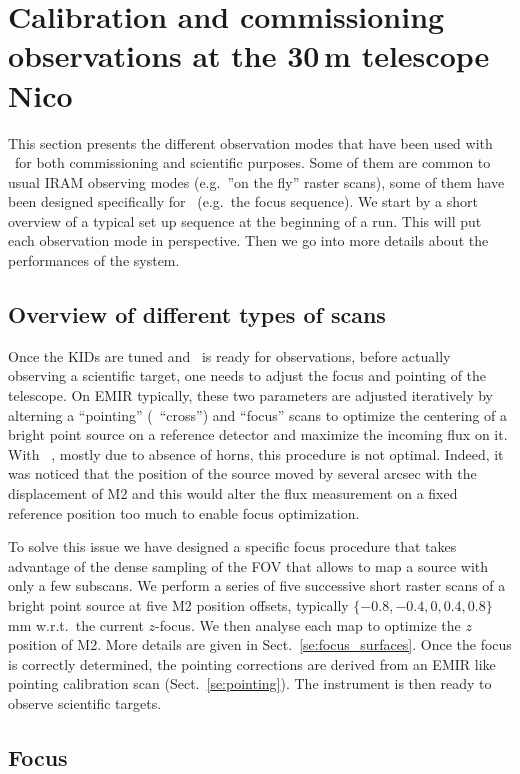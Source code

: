
\section{Calibration and commissioning observations at the 30\,m telescope {\color{YellowGreen} Nico}}

This section presents the different observation modes that have been used with
\nika\ for both commissioning and scientific purposes. Some of them are common
to usual IRAM observing modes (e.g.~''on the fly'' raster scans), some of them
have been designed specifically for \nika\ (e.g.~the focus sequence). We start
by a short overview of a typical set up sequence at the beginning of a run. This
will put each observation mode in perspective. Then we go into more details
about the performances of the system.

\subsection{Overview of different types of scans}

Once the KIDs are tuned and \nika\ is ready for observations, before actually
observing a scientific target, one needs to adjust the focus and pointing of the
telescope. On EMIR typically, these two parameters are adjusted iteratively by
alterning a ``pointing'' (\aka\ ``cross'') and ``focus'' scans to optimize the
centering of a bright point source on a reference detector and maximize the
incoming flux on it. With \nika\ , mostly due to absence of horns, this
procedure is not optimal. Indeed, it was noticed that the position of the source
moved by several arcsec with the displacement of M2 and this would alter the flux
measurement on a fixed reference position too much to enable focus
optimization.

To solve this issue we have designed a specific focus procedure that takes
advantage of the dense sampling of the FOV that allows to map a source with only
a few subscans. We perform a series of five successive short raster scans of a
bright point source at five M2 position offsets, typically $\{-0.8, -0.4, 0,
0.4, 0.8\}$\,mm w.r.t.~the current $z$-focus. We then analyse each map to
optimize the $z$ position of M2. More details are given in
Sect.~\ref{se:focus_surfaces}. Once the focus is correctly determined, the pointing
corrections are derived from an EMIR like pointing calibration scan
(Sect.~\ref{se:pointing}). The instrument is then ready to observe scientific
targets.

\subsection{Focus}

